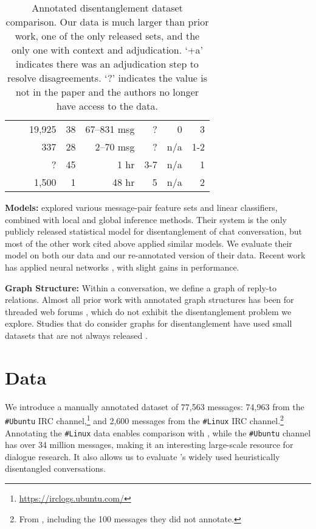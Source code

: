 \documentclass[11pt,a4paper]{article}
\makeatletter
\newcommand{\totaldata}{77,563\@\xspace}
\newcommand{\tightparagraph}[1]{\noindent\textbf{#1:}}
\makeatother
\begin{document}
\begin{table*}
\begin{tabular}{lllrrrrrr}
           & \multicolumn{2}{l}{\citet{Adams:2008}}             & 19,925 & 38 &  67--831 msg &      ? &     0 &   3 \\
           & \multicolumn{2}{l}{\citet{wang-rose:icwsm:2008}}   & $~$337 & 28 &    2--70 msg &      ? &   n/a & 1-2 \\
           & \multicolumn{2}{l}{\citet{mayfield:2012:SIGDIAL}}  &      ? & 45 &        1  hr &    3-7 &   n/a &   1 \\
           & \multicolumn{2}{l}{\citet{Guo:2017:EDB}}           &  1,500 &  1 &       48  hr &      5 &   n/a &   2 \\
        \bottomrule
    \end{tabular}
    \caption{\label{tab:data}
    Annotated disentanglement dataset comparison.
    Our data is much larger than prior work, one of the only released sets, and the only one with context and adjudication.
    `+a' indicates there was an adjudication step to resolve disagreements.
    `?' indicates the value is not in the paper and the authors no longer have access to the data.
    }
\end{table*}
 
\tightparagraph{Models}
\citet{elsner:2008} explored various message-pair feature sets and linear classifiers, combined with local and global inference methods.
Their system is the only publicly released statistical model for disentanglement of chat conversation, but most of the other work cited above applied similar models.
We evaluate their model on both our data and our re-annotated version of their data.
Recent work has applied neural networks \citep{Mehri:2017:IJCNLP,Jiang:NAACL:2018}, with slight gains in performance.

\tightparagraph{Graph Structure}
Within a conversation, we define a graph of reply-to relations.
Almost all prior work with annotated graph structures has been for threaded web forums \cite{schuth2007extracting,kim-wang-baldwin:2010:CONLL,Wang:2011:EMNLP}, which do not exhibit the disentanglement problem we explore.
Studies that do consider graphs for disentanglement have used small datasets \citep{Dulceanu:2016,Mehri:2017:IJCNLP} that are not always released \citep{wang-rose:icwsm:2008,Guo:2017:EDB}.

\section{Data}

We introduce a manually annotated dataset of \totaldata messages: 74,963 from the \texttt{\#Ubuntu} IRC channel,\footnote{
  \url{https://irclogs.ubuntu.com/}
} and 2,600 messages from the \texttt{\#Linux} IRC channel.\footnote{
  From \citet{elsner:2008}, including the 100 messages they did not annotate.
}
Annotating the \texttt{\#Linux} data enables comparison with \citet{elsner:2008}, while the \texttt{\#Ubuntu} channel has over 34 million messages, making it an interesting large-scale resource for dialogue research.
It also allows us to evaluate \citet{Lowe:2015,Lowe:2017:DD}'s widely used heuristically disentangled conversations.
\end{document}
